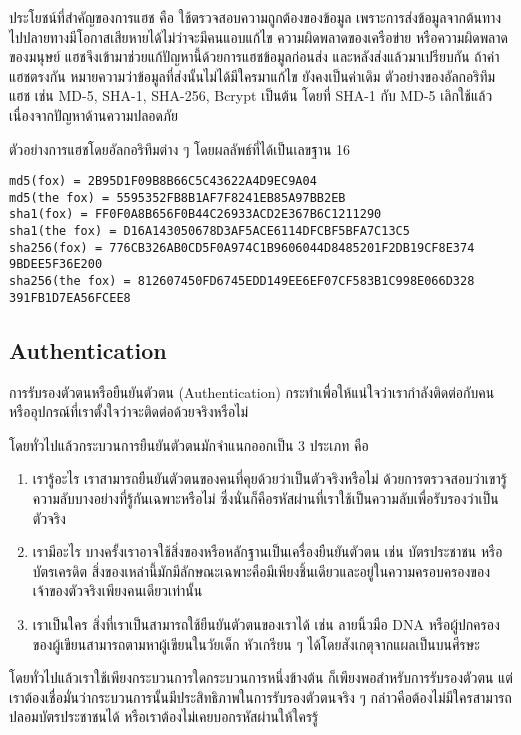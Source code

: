 ประโยชน์ที่สำคัญของการแฮช คือ ใช้ตรวจสอบความถูกต้องของข้อมูล เพราะการส่งข้อมูลจากต้นทางไปปลายทางมีโอกาสเสียหายได้ไม่ว่าจะมีคนแอบแก้ไข ความผิดพลาดของเครือข่าย หรือความผิดพลาดของมนุษย์ แฮชจึงเข้ามาช่วยแก้ปัญหานี้ด้วยการแฮชข้อมูลก่อนส่ง และหลังส่งแล้วมาเปรียบกัน ถ้าค่าแฮชตรงกัน หมายความว่าข้อมูลที่ส่งนั้นไม่ได้มีใครมาแก้ไข ยังคงเป็นค่าเดิม ตัวอย่างของอัลกอริทึมแฮช เช่น MD-5, SHA-1, SHA-256, Bcrypt เป็นต้น โดยที่ SHA-1 กับ MD-5 เลิกใช้แล้วเนื่องจากปัญหาด้านความปลอดภัย

ตัวอย่างการแฮชโดยอัลกอริทึมต่าง ๆ โดยผลลัพธ์ที่ได้เป็นเลขฐาน 16

\begin{lstlisting}[numbers=none] 
md5(fox) = 2B95D1F09B8B66C5C43622A4D9EC9A04
md5(the fox) = 5595352FB8B1AF7F8241EB85A97BB2EB
sha1(fox) = FF0F0A8B656F0B44C26933ACD2E367B6C1211290
sha1(the fox) = D16A143050678D3AF5ACE6114DFCBF5BFA7C13C5
sha256(fox) = 776CB326AB0CD5F0A974C1B9606044D8485201F2DB19CF8E374
9BDEE5F36E200
sha256(the fox) = 812607450FD6745EDD149EE6EF07CF583B1C998E066D328
391FB1D7EA56FCEE8
\end{lstlisting}

\subsection{Authentication}

การรับรองตัวตนหรือยืนยันตัวตน (Authentication) กระทำเพื่อให้แน่ใจว่าเรากำลังติดต่อกับคนหรืออุปกรณ์ที่เราตั้งใจว่าจะติดต่อด้วยจริงหรือไม่

โดยทั่วไปแล้วกระบวนการยืนยันตัวตนมักจำแนกออกเป็น 3 ประเภท คือ

\begin{enumerate}
	\item เรารู้อะไร เราสามารถยืนยันตัวตนของคนที่คุยด้วยว่าเป็นตัวจริงหรือไม่ ด้วยการตรวจสอบว่าเขารู้ความลับบางอย่างที่รู้กันเฉพาะหรือไม่ ซึ่งนั่นก็คือรหัสผ่านที่เราใช้เป็นความลับเพื่อรับรองว่าเป็นตัวจริง 
	\item เรามีอะไร บางครั้งเราอาจใช้สิ่งของหรือหลักฐานเป็นเครื่องยืนยันตัวตน เช่น บัตรประชาชน หรือบัตรเครดิต สิ่งของเหล่านี้มักมีลักษณะเฉพาะคือมีเพียงชิ้นเดียวและอยู่ในความครอบครองของเจ้าของตัวจริงเพียงคนเดียวเท่านั้น
	\item เราเป็นใคร สิ่งที่เราเป็นสามารถใช้ยืนยันตัวตนของเราได้ เช่น ลายนิ้วมือ DNA หรือผู้ปกครองของผู้เขียนสามารถตามหาผู้เขียนในวัยเด็ก หัวเกรียน ๆ ได้โดยสังเกตุจากแผลเป็นบนศีรษะ
\end{enumerate}

โดยทั่วไปแล้วเราใช้เพียงกระบวนการใดกระบวนการหนึ่งข้างต้น ก็เพียงพอสำหรับการรับรองตัวตน แต่เราต้องเชื่อมั่นว่ากระบวนการนั้นมีประสิทธิภาพในการรับรองตัวตนจริง ๆ กล่าวคือต้องไม่มีใครสามารถปลอมบัตรประชาชนได้ หรือเราต้องไม่เคยบอกรหัสผ่านให้ใครรู้

